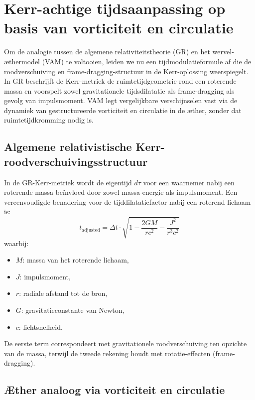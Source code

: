 \section{Kerr-achtige tijdsaanpassing op basis van vorticiteit en circulatie}

Om de analogie tussen de algemene relativiteitstheorie (GR) en het wervel-æthermodel (VAM) te voltooien, leiden we nu een tijdmodulatieformule af die de roodverschuiving en frame-dragging-structuur in de Kerr-oplossing weerspiegelt. In GR beschrijft de Kerr-metriek de ruimtetijdgeometrie rond een roterende massa en voorspelt zowel gravitationele tijdsdilatatie als frame-dragging als gevolg van impulsmoment. VAM legt vergelijkbare verschijnselen vast via de dynamiek van gestructureerde vorticiteit en circulatie in de æther, zonder dat ruimtetijdkromming nodig is.

\subsection{Algemene relativistische Kerr-roodverschuivingsstructuur}

In de GR-Kerr-metriek wordt de eigentijd $d\tau$ voor een waarnemer nabij een roterende massa beïnvloed door zowel massa-energie als impulsmoment. Een vereenvoudigde benadering voor de tijddilatatiefactor nabij een roterend lichaam is:
\begin{equation}
t_{\text{adjusted}} = \Delta t \cdot \sqrt{1 - \frac{2GM}{rc^2} - \frac{J^2}{r^3c^2}}
\label{eq:Kerr_time_dilation}
\end{equation}
waarbij:
\begin{itemize}
\item $M$: massa van het roterende lichaam,
\item $J$: impulsmoment,
\item $r$: radiale afstand tot de bron,
\item $G$: gravitatieconstante van Newton,
\item $c$: lichtsnelheid.
\end{itemize}

De eerste term correspondeert met gravitationele roodverschuiving ten opzichte van de massa, terwijl de tweede rekening houdt met rotatie-effecten (frame-dragging).

\subsection{Æther analoog via vorticiteit en circulatie}

